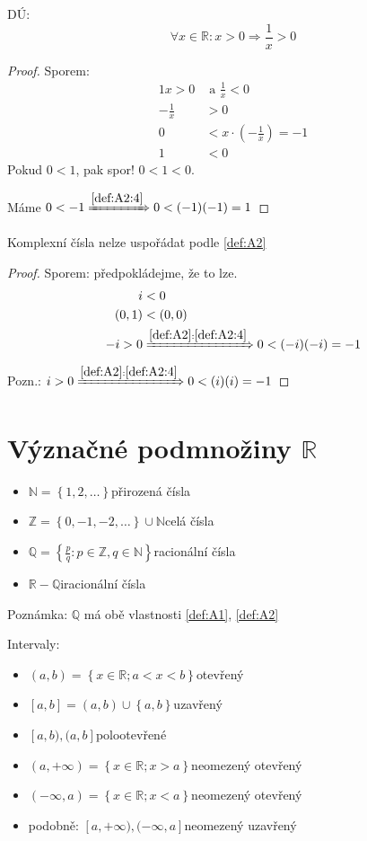 DÚ:
\begin{equation}
	\forall x \in \mathbb{R}: x>0 \Rightarrow \frac{1}{x}>0
\end{equation}
\begin{proof}
	Sporem:
	\begin{alignat*}{1}
		x>0 &\text{ a } \frac{1}{x}<0 \\
		-\frac{1}{x}&>0 \\
		0&<x\cdot\left(-\frac{1}{x}\right) = -1 \\
		1 &< 0
	\end{alignat*}
	Pokud $0<1$, pak spor! $0<1<0$.

	Máme $0<-1 \xRightarrow{\autoref{def:A2:4}} 0<(-1)(-1) = 1$
\end{proof}

\begin{example}
	Komplexní čísla nelze uspořádat podle \autoref{def:A2}
\end{example}
\begin{proof}
	Sporem: předpokládejme, že to lze.
	\begin{alignat*}{1}
		i&<0 \\
		(0,1)&<(0,0) \\
		-i>0 &\xRightarrow{\autoref*{def:A2}:\autoref{def:A2:4}} 0<(-i)(-i) = -1
	\end{alignat*}
	Pozn.: $i>0 \xRightarrow{\autoref*{def:A2}:\autoref{def:A2:4}} 0<(i)(i) = -1$
\end{proof}

\section{Význačné podmnožiny \texorpdfstring{$\mathbb{R}$}{R}}
\begin{itemize}
	\item $\mathbb{N} = \left\{1,2,\ldots\right\}$\quad přirozená čísla
	\item $\mathbb{Z} = \left\{0,-1,-2,\ldots\right\}\cup\mathbb{N}$\quad celá čísla
	\item $\mathbb{Q} = \left\{\frac{p}{q}: p\in\mathbb{Z}, q\in\mathbb{N}\right\}$\quad racionální čísla
	\item $\mathbb{R} - \mathbb{Q}$\quad iracionální čísla
\end{itemize}

Poznámka: $\mathbb{Q}$ má obě vlastnosti \autoref{def:A1}, \autoref{def:A2}

Intervaly:
\begin{itemize}
	\item $(a,b) = \left\{x\in\mathbb{R}; a<x<b\right\}$\quad otevřený
	\item $[a,b] = (a,b)\cup\left\{a,b\right\}$\quad uzavřený
	\item $[a,b), (a,b]$\quad polootevřené
	\item $(a,+\infty) = \left\{x\in\mathbb{R}; x>a\right\}$\quad neomezený otevřený
	\item $(-\infty, a) = \left\{x\in\mathbb{R}; x<a\right\}$\quad neomezený otevřený
	\item podobně: $[a, +\infty), (-\infty, a]$\quad neomezený uzavřený
\end{itemize}

